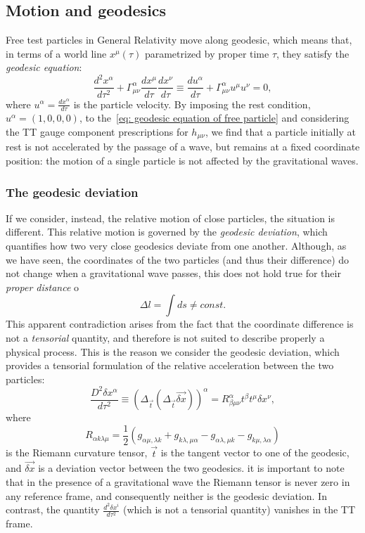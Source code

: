 \subsection{Motion and geodesics}
Free test particles in General Relativity move along geodesic, which means that, in terms of a world line $x^\mu(\tau)$ parametrized by proper time $\tau$, they satisfy the \textit{geodesic equation}:
\begin{equation}
    \frac{d^2x^\alpha}{d\tau^2} + \Gamma^\alpha_{\mu\nu} \frac{dx^\mu}{d\tau}\frac{dx^\nu}{d\tau} \equiv \frac{du^\alpha}{d\tau} + \Gamma^\alpha_{\mu\nu}u^\mu u^\nu = 0,
    \label{eq: geodesic equation of free particle}
\end{equation}
where $u^\alpha = \frac{dx^\alpha}{d\tau}$ is the particle velocity.
By imposing the rest condition, $u^\alpha = (1,0,0,0)$, to the~\eqref{eq: geodesic equation of free particle} and considering the TT gauge component prescriptions for $h_{\mu\nu}$, we find that a particle initially at rest is not accelerated by the passage of a wave, but remains at a fixed coordinate position: the motion of a single particle is not affected by the gravitational waves.

\subsubsection{The geodesic deviation}
If we consider, instead, the relative motion of close particles, the situation is different.
This relative motion is governed by the \textit{geodesic deviation}, which quantifies how two very close geodesics deviate from one another.
Although, as we have seen, the coordinates of the two particles (and thus their difference) do not change when a gravitational wave passes, this does not hold true for their \textit{proper distance} o
\[
    \Delta l = \int ds \not = const.
\]
This apparent contradiction arises from the fact that the coordinate difference is not a \textit{tensorial} quantity, and therefore is not suited to describe properly a physical process.
This is the reason we consider the geodesic deviation, which provides a tensorial formulation of the relative acceleration between the two particles: 
\begin{equation}
    \frac{D^2\delta x^\alpha}{d\tau^2} \equiv (\Delta_{\vec{t}}(\Delta_{\vec{t}}\vec{\delta x}))^\alpha = R^\alpha_{\beta\mu\nu}t^\beta t^\mu \delta x^\nu,
    \label{eq: geodesic deviation}
\end{equation}
where 
\begin{equation}
    R_{\alpha k \lambda \mu} = \frac{1}{2}( g_{\alpha\mu,\lambda k}  + g_{k\lambda,\mu \alpha }  - g_{\alpha\lambda,\mu k }  - g_{k\mu,\lambda \alpha })
    \label{eq: Riemann tensor def}
\end{equation}
is the Riemann curvature tensor, $\vec{t}$ is the tangent vector to one of the geodesic, and $\vec{\delta x}$ is a deviation vector between the two geodesics.
it is important to note that in the presence of a gravitational wave the Riemann tensor is never zero in any reference frame, and consequently neither is the geodesic deviation. 
In contrast, the quantity $\frac{d^2\delta x^i}{d\tau^2}$ (which is not a tensorial quantity) vanishes in the TT frame.

